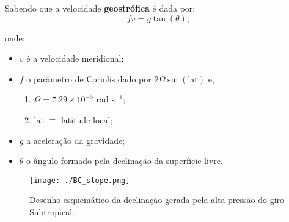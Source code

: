 Sabendo que a velocidade {\bf geostrófica} é dada por:
 \[
    fv = g\tan(\theta),
 \]


onde:
\begin{itemize}
 \item $v$ é a velocidade meridional;
 \item $f$ o parâmetro de Coriolis dado por $2\Omega\sin(\text{lat})$ e,
  \begin{enumerate}
   \item[] $\Omega = 7.29 \times 10^{-5}$ rad s$^{-1}$;
   \item[] lat $\equiv$ latitude local;
  \end{enumerate}

 \item $g$ a aceleração da gravidade;
 \item $\theta$ o ângulo formado pela declinação da superfície livre.
\end{itemize}

\begin{figure}[ht]
  \centering
  \texttt{[image: ./BC\_slope.png]}
  \caption{Desenho esquemático da declinação gerada pela alta pressão do giro
           Subtropical.}
  \label{fig:BC}
\end{figure}


